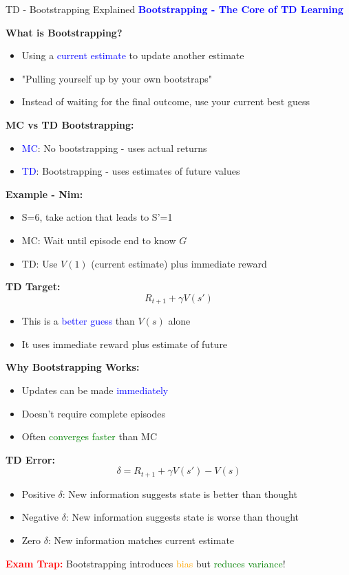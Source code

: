 \documentclass[8pt]{beamer}
\begin{document}
	\begin{frame}{TD - Bootstrapping Explained}
		\fontsize{6.5}{7.5}\selectfont
		\textcolor{blue}{\textbf{Bootstrapping - The Core of TD Learning}}
		
		\textbf{What is Bootstrapping?}
		\begin{itemize}
			\item Using a \textcolor{blue}{current estimate} to update another estimate
			\item "Pulling yourself up by your own bootstraps"
			\item Instead of waiting for the final outcome, use your current best guess
		\end{itemize}
		
		\textbf{MC vs TD Bootstrapping:}
		\begin{itemize}
			\item \textcolor{blue}{MC}: No bootstrapping - uses actual returns
			\item \textcolor{blue}{TD}: Bootstrapping - uses estimates of future values
		\end{itemize}
		
		\textbf{Example - Nim:}
		\begin{itemize}
			\item S=6, take action that leads to S'=1
			\item MC: Wait until episode end to know $G$
			\item TD: Use $V(1)$ (current estimate) plus immediate reward
		\end{itemize}
		
		\textbf{TD Target:}
		\[
		R_{t+1} + \gamma V(s')
		\]
		\begin{itemize}
			\item This is a \textcolor{blue}{better guess} than $V(s)$ alone
			\item It uses immediate reward plus estimate of future
		\end{itemize}
		
		\textbf{Why Bootstrapping Works:}
		\begin{itemize}
			\item Updates can be made \textcolor{blue}{immediately}
			\item Doesn't require complete episodes
			\item Often \textcolor{green}{converges faster} than MC
		\end{itemize}
		
		\textbf{TD Error:}
		\[
		\delta = R_{t+1} + \gamma V(s') - V(s)
		\]
		\begin{itemize}
			\item Positive $\delta$: New information suggests state is better than thought
			\item Negative $\delta$: New information suggests state is worse than thought
			\item Zero $\delta$: New information matches current estimate
		\end{itemize}
		
		\textcolor{red}{\textbf{Exam Trap:}} Bootstrapping introduces \textcolor{orange}{bias} but \textcolor{green}{reduces variance}!
	\end{frame}
	
\end{document}
